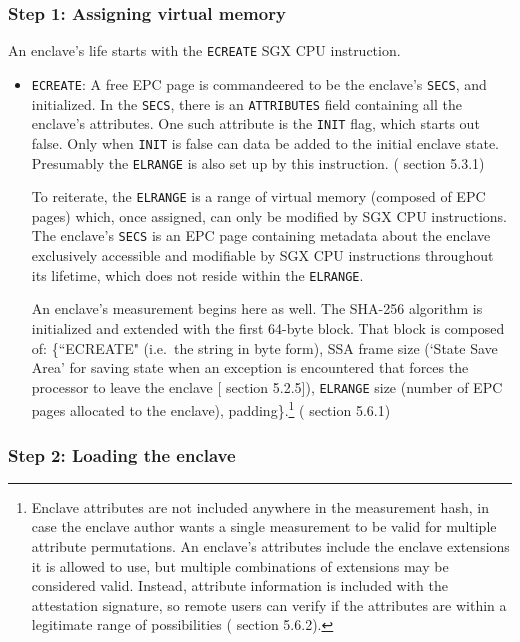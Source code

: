 \subsubsection{Step 1: Assigning virtual memory}

An enclave's life starts with the {\tt ECREATE} SGX CPU instruction.

\begin{itemize}
    \item {\tt ECREATE}: A free EPC page is commandeered to be the enclave's {\tt SECS}, and initialized. In the {\tt SECS}, there is an {\tt ATTRIBUTES} field containing all the enclave's attributes. One such attribute is the {\tt INIT} flag, which starts out false. Only when {\tt INIT} is false can data be added to the initial enclave state. Presumably the {\tt ELRANGE} is also set up by this instruction. (\cite{intel-sgx-explained-advanced} section 5.3.1)

    To reiterate, the {\tt ELRANGE} is a range of virtual memory (composed of EPC pages) which, once assigned, can only be modified by SGX CPU instructions. The enclave's {\tt SECS} is an EPC page containing metadata about the enclave exclusively accessible and modifiable by SGX CPU instructions throughout its lifetime, which does not reside within the {\tt ELRANGE}.

    An enclave's measurement begins here as well. The SHA-256 algorithm is initialized and extended with the first 64-byte block. That block is composed of: \{``ECREATE" (i.e.\ the string in byte form), SSA frame size (`State Save Area' for saving state when an exception is encountered that forces the processor to leave the enclave [\cite{intel-sgx-explained-advanced} section 5.2.5]), {\tt ELRANGE} size (number of EPC pages allocated to the enclave), padding\}.\footnote{Enclave attributes are not included anywhere in the measurement hash, in case the enclave author wants a single measurement to be valid for multiple attribute permutations. An enclave's attributes include the enclave extensions it is allowed to use, but multiple combinations of extensions may be considered valid. Instead, attribute information is included with the attestation signature, so remote users can verify if the attributes are within a legitimate range of possibilities (\cite{intel-sgx-explained-advanced} section 5.6.2).} (\cite{intel-sgx-explained-advanced} section 5.6.1)
\end{itemize}

\subsubsection{Step 2: Loading the enclave}

